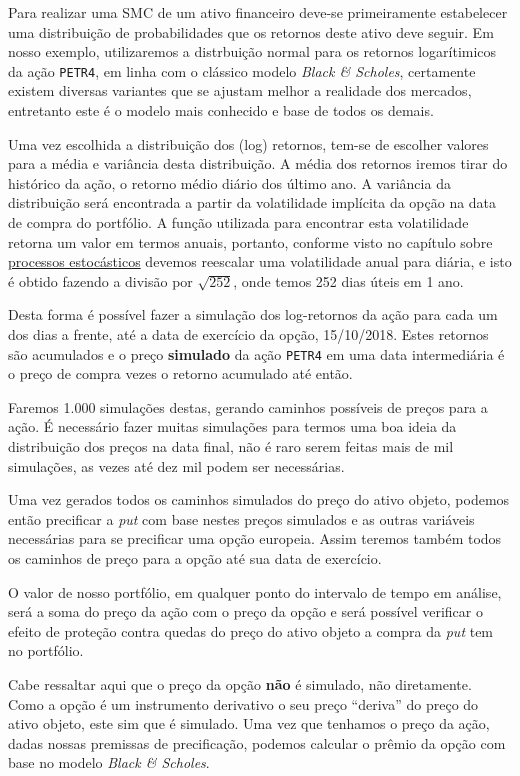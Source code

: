 \documentclass[]{book}
\theoremstyle{definition}
\theoremstyle{definition}
\theoremstyle{definition}
\theoremstyle{remark}
\begin{document}
Para realizar uma SMC de um ativo financeiro deve-se primeiramente estabelecer uma distribuição de probabilidades que os retornos deste ativo deve seguir. Em nosso exemplo, utilizaremos a distrbuição normal para os retornos logarítimicos da ação \texttt{PETR4}, em linha com o clássico modelo \emph{Black \& Scholes}, certamente existem diversas variantes que se ajustam melhor a realidade dos mercados, entretanto este é o modelo mais conhecido e base de todos os demais.

Uma vez escolhida a distribuição dos (log) retornos, tem-se de escolher valores para a média e variância desta distribuição. A média dos retornos iremos tirar do histórico da ação, o retorno médio diário dos último ano. A variância da distribuição será encontrada a partir da volatilidade implícita da opção na data de compra do portfólio. A função utilizada para encontrar esta volatilidade retorna um valor em termos anuais, portanto, conforme visto no capítulo sobre \protect\hyperlink{processos-estocasticos}{processos estocásticos} devemos reescalar uma volatilidade anual para diária, e isto é obtido fazendo a divisão por \(\sqrt{252}\), onde temos 252 dias úteis em 1 ano.

Desta forma é possível fazer a simulação dos log-retornos da ação para cada um dos dias a frente, até a data de exercício da opção, 15/10/2018. Estes retornos são acumulados e o preço \textbf{simulado} da ação \texttt{PETR4} em uma data intermediária é o preço de compra vezes o retorno acumulado até então.

Faremos 1.000 simulações destas, gerando caminhos possíveis de preços para a ação. É necessário fazer muitas simulações para termos uma boa ideia da distribuição dos preços na data final, não é raro serem feitas mais de mil simulações, as vezes até dez mil podem ser necessárias.

Uma vez gerados todos os caminhos simulados do preço do ativo objeto, podemos então precificar a \emph{put} com base nestes preços simulados e as outras variáveis necessárias para se precificar uma opção europeia. Assim teremos também todos os caminhos de preço para a opção até sua data de exercício.

O valor de nosso portfólio, em qualquer ponto do intervalo de tempo em análise, será a soma do preço da ação com o preço da opção e será possível verificar o efeito de proteção contra quedas do preço do ativo objeto a compra da \emph{put} tem no portfólio.

Cabe ressaltar aqui que o preço da opção \textbf{não} é simulado, não diretamente. Como a opção é um instrumento derivativo o seu preço ``deriva'' do preço do ativo objeto, este sim que é simulado. Uma vez que tenhamos o preço da ação, dadas nossas premissas de precificação, podemos calcular o prêmio da opção com base no modelo \emph{Black \& Scholes}.
\end{document}
